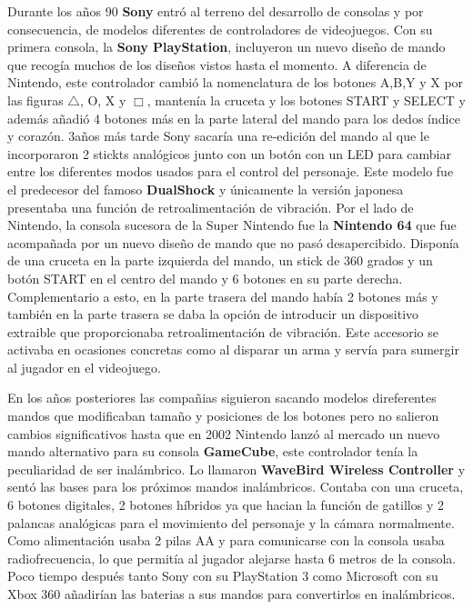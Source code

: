 Durante los a\~nos 90 \textbf{Sony} entr\'o al terreno del desarrollo de consolas y por consecuencia, de modelos diferentes de controladores de videojuegos. Con su primera consola, la \textbf{Sony PlayStation}, incluyeron un nuevo dise\~no de mando que recog\'ia muchos de los dise\~nos vistos hasta el momento. A diferencia de Nintendo, este controlador cambi\'o la nomenclatura de los botones A,B,Y y X por las figuras $\triangle$, O, X y $\Box$, manten\'ia la cruceta y los botones START y SELECT y adem\'as a\~nadi\'o 4 botones m\'as en la parte lateral del mando para los dedos \'indice y coraz\'on. 3a\~nos m\'as tarde Sony sacar\'ia una re-edici\'on del mando al que le incorporaron 2 stickts anal\'ogicos junto con un bot\'on con un LED para cambiar entre los diferentes modos usados para el control del personaje. Este modelo fue el predecesor del famoso \textbf{DualShock} y \'unicamente la versi\'on japonesa presentaba una funci\'on de retroalimentaci\'on de vibraci\'on. Por el lado de Nintendo, la consola sucesora de la Super Nintendo fue la \textbf{Nintendo 64} que fue acompa\~nada por un nuevo dise\~no de mando que no pas\'o desapercibido. Dispon\'ia de una cruceta en la parte izquierda del mando, un stick de 360 grados y un bot\'on START en el centro del mando y 6 botones en su parte derecha. Complementario a esto, en la parte trasera del mando hab\'ia 2 botones m\'as y tambi\'en en la parte trasera se daba la opci\'on de introducir un dispositivo extraible que proporcionaba retroalimentaci\'on de vibraci\'on. Este accesorio se activaba en ocasiones concretas como al disparar un arma y serv\'ia para sumergir al jugador en el videojuego.\par

En los a\~nos posteriores las compa\~nias siguieron sacando modelos direferentes mandos que modificaban tama\~no y posiciones de los botones pero no salieron cambios significativos hasta que en 2002 Nintendo lanz\'o al mercado un nuevo mando alternativo para su consola \textbf{GameCube}, este controlador ten\'ia la peculiaridad de ser inal\'ambrico. Lo llamaron \textbf{WaveBird Wireless Controller} y sent\'o las bases para los pr\'oximos mandos inal\'ambricos. Contaba con una cruceta, 6 botones digitales, 2 botones h\'ibridos ya que hacian la funci\'on de gatillos y 2 palancas anal\'ogicas para el movimiento del personaje y la c\'amara normalmente. Como alimentaci\'on usaba 2 pilas AA y para comunicarse con la consola usaba radiofrecuencia, lo que permit\'ia al jugador alejarse hasta 6 metros de la consola. Poco tiempo despu\'es tanto Sony con su PlayStation 3 como Microsoft con su Xbox 360 a\~nadir\'ian las baterias a sus mandos para convertirlos en inal\'ambricos. \par

